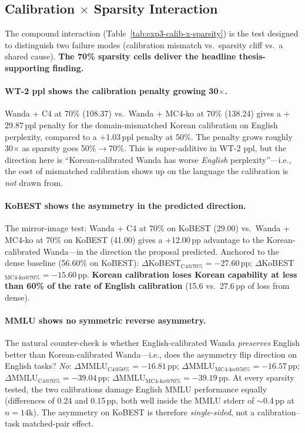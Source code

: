 \documentclass{article}
\begin{document}
\subsection{Calibration $\times$ Sparsity Interaction}

The compound interaction (Table~\ref{tab:exp3-calib-x-sparsity}) is the
test designed to distinguish two failure modes (calibration mismatch vs.\
sparsity cliff vs.\ a shared cause). \textbf{The 70\% sparsity cells
deliver the headline thesis-supporting finding.}

\paragraph{WT-2 ppl shows the calibration penalty growing 30$\times$.}
Wanda + C4 at 70\% (108.37) vs.\ Wanda + MC4-ko at 70\% (138.24) gives a
$+$29.87\,ppl penalty for the domain-mismatched Korean calibration on
English perplexity, compared to a $+$1.03\,ppl penalty at 50\%. The
penalty grows roughly 30$\times$ as sparsity goes 50\%$\rightarrow$70\%.
This is super-additive in WT-2 ppl, but the direction here is
``Korean-calibrated Wanda has worse \emph{English} perplexity''---i.e.,
the cost of mismatched calibration shows up on the language the
calibration is \emph{not} drawn from.

\paragraph{KoBEST shows the asymmetry in the predicted direction.}
The mirror-image test: Wanda + C4 at 70\% on KoBEST (29.00) vs.\ Wanda +
MC4-ko at 70\% on KoBEST (41.00) gives a $+$12.00\,pp advantage to the
Korean-calibrated Wanda---in the direction the proposal predicted.
Anchored to the dense baseline (56.60\% on KoBEST):
$\Delta$KoBEST$_{\text{C4@70\%}}=-27.60$\,pp;
$\Delta$KoBEST$_{\text{MC4-ko@70\%}}=-15.60$\,pp.
\textbf{Korean calibration loses Korean capability at less than 60\% of
the rate of English calibration} (15.6 vs.\ 27.6\,pp of loss from
dense).

\paragraph{MMLU shows no symmetric reverse asymmetry.} The natural
counter-check is whether English-calibrated Wanda \emph{preserves}
English better than Korean-calibrated Wanda---i.e., does the asymmetry
flip direction on English tasks? \emph{No}:
$\Delta$MMLU$_{\text{C4@50\%}}=-16.81$\,pp;
$\Delta$MMLU$_{\text{MC4-ko@50\%}}=-16.57$\,pp;
$\Delta$MMLU$_{\text{C4@70\%}}=-39.04$\,pp;
$\Delta$MMLU$_{\text{MC4-ko@70\%}}=-39.19$\,pp.
At every sparsity tested, the two calibrations damage English MMLU
performance equally (differences of 0.24 and 0.15\,pp, both well
inside the MMLU stderr of $\sim$0.4\,pp at $n{=}14$k). The asymmetry
on KoBEST is therefore \emph{single-sided}, not a calibration--task
matched-pair effect.
\end{document}
